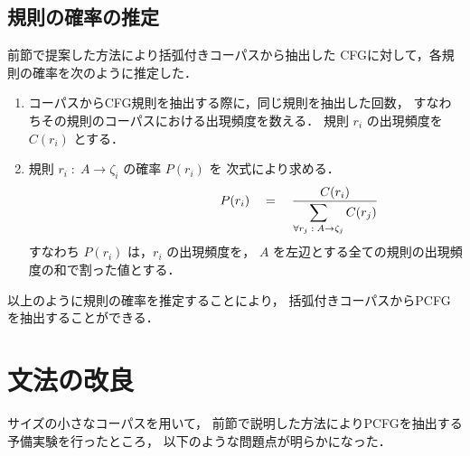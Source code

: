 \subsection{規則の確率の推定}
\label{sec:規則の確率の推定}

前節で提案した方法により括弧付きコーパスから抽出した
CFGに対して，各規則の確率を次のように推定した\cite{wetherell80a}．

\newpage
\begin{flushleft}
  \vspace*{2mm}{\bf 【規則の確率の推定】}\vspace*{-3mm}
\end{flushleft}

\begin{enumerate}
\item
  コーパスからCFG規則を抽出する際に，同じ規則を抽出した回数，
  すなわちその規則のコーパスにおける出現頻度を数える．
  規則 $r_i$ の出現頻度を $C(r_i)$ とする．

\item
  規則 $r_i \;:\; A \rightarrow \zeta_i$ の確率 $P(r_i)$ を
  次式により求める．
  \begin{equation}
    \label{eq:規則の確率}
    \hspace*{30mm}
    P(r_i) \quad = \quad 
      \frac{C(r_i)}
           {\displaystyle
            \sum_{\forall r_j \;:\; A \rightarrow \zeta_j} C(r_j)}
  \end{equation}
  すなわち $P(r_i)$ は，$r_i$ の出現頻度を，
  $A$ を左辺とする全ての規則の出現頻度の和で割った値とする．
\end{enumerate}

以上のように規則の確率を推定することにより，
括弧付きコーパスからPCFGを抽出することができる．
\section{文法の改良}
\label{sec:文法の改良}

サイズの小さなコーパスを用いて，
前節で説明した方法によりPCFGを抽出する予備実験を行ったところ，
以下のような問題点が明らかになった．

